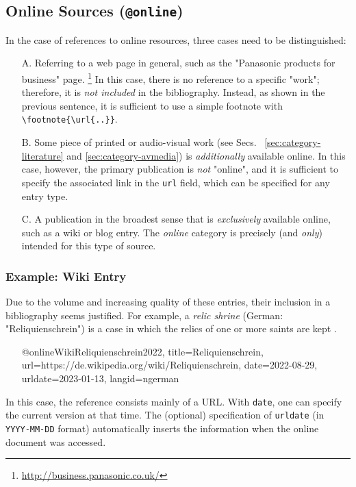 \subsection{Online Sources (\texttt{\bfseries @online})}
\label{sec:category-online}

In the case of references to online resources, three cases need to be
distinguished:
%
\begin{itemize}
    \item[A.] Referring to a web page in general, such as the "Panasonic
    products for business" page.%
    \footnote{\url{http://business.panasonic.co.uk/}}
    In this case, there is no reference to a specific "work"; therefore, it is
    \emph{not included} in the bibliography. Instead, as shown in the previous
    sentence, it is sufficient to use a simple footnote with
    \verb!\footnote{\url{..}}!.
%
    \item[B.] Some piece of printed or audio-visual work (see Secs.~%
    \ref{sec:category-literature} and \ref{sec:category-avmedia}) is
    \emph{additionally} available online. In this case, however, the primary
    publication is \emph{not} "online", and it is sufficient to specify the
    associated link in the \texttt{url} field, which can be specified for any
    entry type.
%
    \item[C.] A publication in the broadest sense that is
    \emph{exclusively} available online, such as a wiki or blog entry. The \emph{online} category
    is precisely (and \emph{only}) intended for this type of source.
\end{itemize}

\subsubsection{Example: Wiki Entry}
\label{sec:@online-www}

Due to the volume and increasing quality of these entries, their inclusion in
a bibliography seems justified. For example, a \emph{relic shrine} (German:
"Reliquienschrein") is a case in which the relics of one or more saints are
kept \cite{WikiReliquienschrein2022}.
%
\begin{itemize}
\item[]
\begin{GenericCode}[numbers=none]
@online{WikiReliquienschrein2022,
  title={Reliquienschrein},
  url={https://de.wikipedia.org/wiki/Reliquienschrein},
  date={2022-08-29},
  urldate={2023-01-13},
  langid={ngerman}
}
\end{GenericCode}
\item[\cite{WikiReliquienschrein2022}] 
\end{itemize}
%
In this case, the reference consists mainly of a URL. With \texttt{date}, one
can specify the current version at that time. The (optional) specification of
\texttt{urldate} (in \texttt{YYYY-MM-DD} format) automatically inserts the
information when the online document was accessed.

